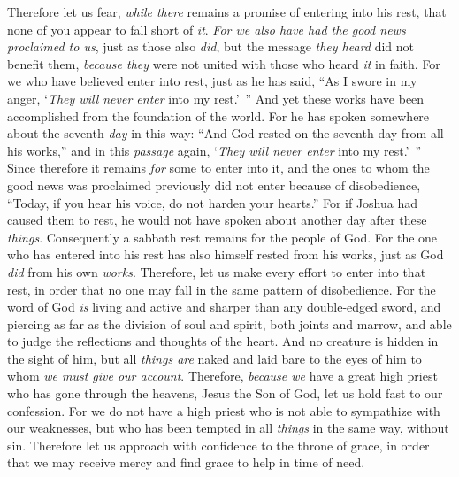 \begin{biblechapter} %
 Therefore let us fear, \textit{while there} remains a promise of entering into his rest, that none of you appear to fall short of \textit{it}.
\verse \textit{For we also have had the good news proclaimed to us}, just as those also \textit{did}, but the message \textit{they heard} did not benefit them, \textit{because they} were not united with those who heard \textit{it} in faith.
\verse For we who have believed enter into rest, just as he has said, “As I swore in my anger, 
‘\textit{They will never enter} into my rest.’ ”
\verse And yet these works have been accomplished from the foundation of the world.
\verse For he has spoken somewhere about the seventh \textit{day} in this way: “And God rested on the seventh day from all his works,”
\verse and in this \textit{passage} again, ‘\textit{They will never enter} into my rest.’ ”
\verse Since therefore it remains \textit{for} some to enter into it, and the ones to whom the good news was proclaimed previously did not enter because of disobedience, “Today, if you hear his voice, 
do not harden your hearts.”
\verse For if Joshua had caused them to rest, he would not have spoken about another day after these \textit{things}.
\verse Consequently a sabbath rest remains for the people of God.
\verse For the one who has entered into his rest has also himself rested from his works, just as God \textit{did} from his own \textit{works}.
\verse Therefore, let us make every effort to enter into that rest, in order that no one may fall in the same pattern of disobedience.
\verse For the word of God \textit{is} living and active and sharper than any double-edged sword, and piercing as far as the division of soul and spirit, both joints and marrow, and able to judge the reflections and thoughts of the heart.
\verse And no creature is hidden in the sight of him, but all \textit{things are} naked and laid bare to the eyes of him to whom \textit{we must give our account}.
 Therefore, \textit{because we} have a great high priest who has gone through the heavens, Jesus the Son of God, let us hold fast to our confession.
\verse For we do not have a high priest who is not able to sympathize with our weaknesses, but who has been tempted in all \textit{things} in the same way, without sin.
\verse Therefore let us approach with confidence to the throne of grace, in order that we may receive mercy and find grace to help in time of need.
\end{biblechapter}

